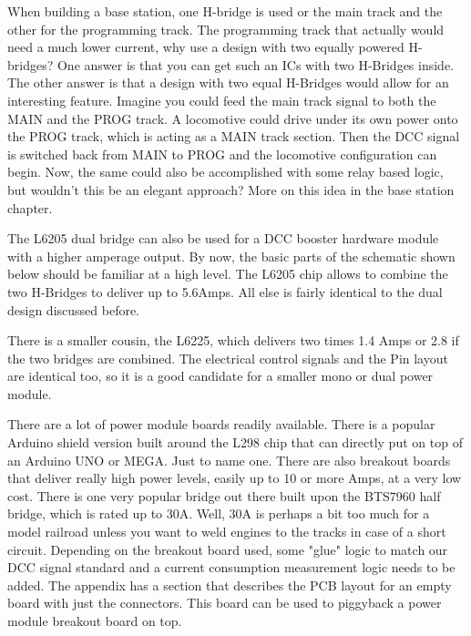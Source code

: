 When building a base station, one H-bridge is used or the main track and the other for the programming track. The programming track that actually would need a much lower current, why use a design with two equally powered H-bridges? One answer is that you can get such an ICs with two H-Bridges inside. The other answer is that a design with two equal H-Bridges would allow for an interesting feature. Imagine you could feed the main track signal to both the MAIN and the PROG track. A locomotive could drive under its own power onto the PROG track, which is acting as a MAIN track section. Then the DCC signal is switched back from MAIN to PROG and the locomotive configuration can begin. Now, the same could also be accomplished with some relay based logic, but wouldn't this be an elegant approach? More on this idea in the base station chapter.


The L6205 dual bridge can also be used for a DCC booster hardware module with a higher amperage output. By now, the basic parts of the schematic shown below should be familiar at a high level. The L6205 chip allows to combine the two H-Bridges to deliver up to 5.6Amps. All else is fairly identical to the dual design discussed before.

\FloatBarrier

There is a smaller cousin, the L6225, which delivers two times 1.4 Amps or 2.8 if the two bridges are combined. The electrical control signals and the Pin layout are identical too, so it is a good candidate for a smaller mono or dual power module.


There are a lot of power module boards readily available. There is a popular Arduino shield version built around the L298 chip that can directly put on top of an Arduino UNO or MEGA. Just to name one. There are also breakout boards that deliver really high power levels, easily up to 10 or more Amps, at a very low cost. There is one very popular bridge out there built upon the BTS7960 half bridge, which is rated up to 30A. Well, 30A is perhaps a bit too much for a model railroad unless you want to weld engines to the tracks in case of a short circuit. Depending on the breakout board used, some "glue" logic to match our DCC signal standard and a current consumption measurement logic needs to be added. The appendix has a section that describes the PCB layout for an empty board with just the connectors. This board can be used to piggyback a power module breakout board on top.

